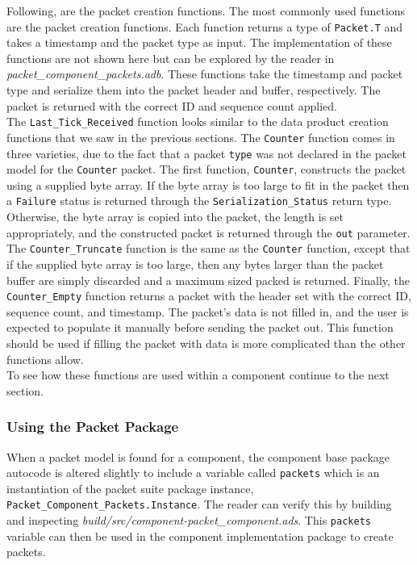 Following, are the packet creation functions. The most commonly used functions are the packet creation functions. Each function returns a type of \texttt{Packet.T} and takes a timestamp and the packet type as input. The implementation of these functions are not shown here but can be explored by the reader in \textit{packet\_component\_packets.adb}. These functions take the timestamp and packet type and serialize them into the packet header and buffer, respectively. The packet is returned with the correct ID and sequence count applied. \\

The \texttt{Last\_Tick\_Received} function looks similar to the data product creation functions that we saw in the previous sections. The \texttt{Counter} function comes in three varieties, due to the fact that a packet \texttt{type} was not declared in the packet model for the \texttt{Counter} packet. The first function, \texttt{Counter}, constructs the packet using a supplied byte array. If the byte array is too large to fit in the packet then a \texttt{Failure} status is returned through the \texttt{Serialization\_Status} return type. Otherwise, the byte array is copied into the packet, the length is set appropriately, and the constructed packet is returned through the \texttt{out} parameter. The \texttt{Counter\_Truncate} function is the same as the \texttt{Counter} function, except that if the supplied byte array is too large, then any bytes larger than the packet buffer are simply discarded and a maximum sized packed is returned. Finally, the \texttt{Counter\_Empty} function returns a packet with the header set with the correct ID, sequence count, and timestamp. The packet's data is not filled in, and the user is expected to populate it manually before sending the packet out. This function should be used if filling the packet with data is more complicated than the other functions allow. \\

To see how these functions are used within a component continue to the next section.

\subsubsection{Using the Packet Package}

When a packet model is found for a component, the component base package autocode is altered slightly to include a variable called \texttt{packets} which is an instantiation of the packet suite package instance, \texttt{Packet\_Component\_Packets.Instance}. The reader can verify this by building and inspecting \textit{build/src/component-packet\_component.ads}. This \texttt{packets} variable can then be used in the component implementation package to create packets. \\

